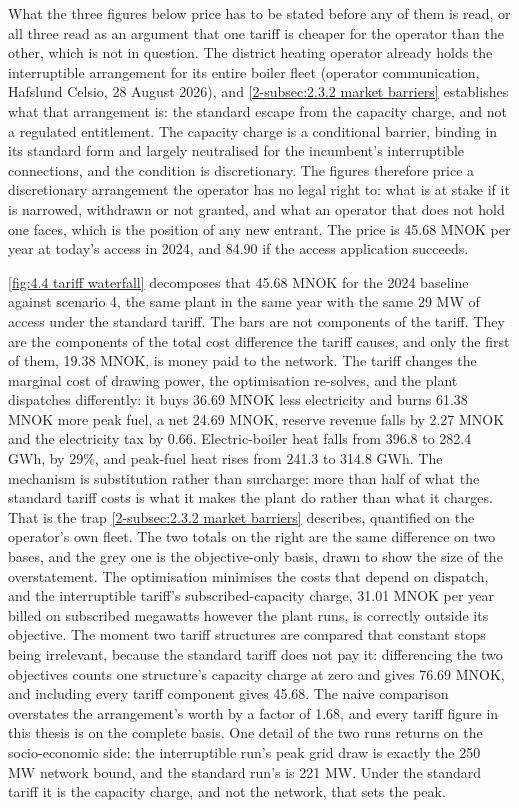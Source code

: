 What the three figures below price has to be stated before any of them is read, or all three read as an argument that one tariff is cheaper for the operator than the other, which is not in question. The district heating operator already holds the interruptible arrangement for its entire boiler fleet (operator communication, Hafslund Celsio, 28 August 2026), and \autoref{2-subsec:2.3.2 market barriers} establishes what that arrangement is: the standard escape from the capacity charge, and not a regulated entitlement. The capacity charge is a conditional barrier, binding in its standard form and largely neutralised for the incumbent's interruptible connections, and the condition is discretionary. The figures therefore price a discretionary arrangement the operator has no legal right to: what is at stake if it is narrowed, withdrawn or not granted, and what an operator that does not hold one faces, which is the position of any new entrant. The price is 45.68 MNOK per year at today's access in 2024, and 84.90 if the access application succeeds.

\autoref{fig:4.4 tariff waterfall} decomposes that 45.68 MNOK for the 2024 baseline against scenario 4, the same plant in the same year with the same 29 MW of access under the standard tariff. The bars are not components of the tariff. They are the components of the total cost difference the tariff causes, and only the first of them, 19.38 MNOK, is money paid to the network. The tariff changes the marginal cost of drawing power, the optimisation re-solves, and the plant dispatches differently: it buys 36.69 MNOK less electricity and burns 61.38 MNOK more peak fuel, a net 24.69 MNOK, reserve revenue falls by 2.27 MNOK and the electricity tax by 0.66. Electric-boiler heat falls from 396.8 to 282.4 GWh, by $29\%$, and peak-fuel heat rises from 241.3 to 314.8 GWh. The mechanism is substitution rather than surcharge: more than half of what the standard tariff costs is what it makes the plant do rather than what it charges. That is the trap \autoref{2-subsec:2.3.2 market barriers} describes, quantified on the operator's own fleet. The two totals on the right are the same difference on two bases, and the grey one is the objective-only basis, drawn to show the size of the overstatement. The optimisation minimises the costs that depend on dispatch, and the interruptible tariff's subscribed-capacity charge, 31.01 MNOK per year billed on subscribed megawatts however the plant runs, is correctly outside its objective. The moment two tariff structures are compared that constant stops being irrelevant, because the standard tariff does not pay it: differencing the two objectives counts one structure's capacity charge at zero and gives 76.69 MNOK, and including every tariff component gives 45.68. The naive comparison overstates the arrangement's worth by a factor of 1.68, and every tariff figure in this thesis is on the complete basis. One detail of the two runs returns on the socio-economic side: the interruptible run's peak grid draw is exactly the 250 MW network bound, and the standard run's is 221 MW. Under the standard tariff it is the capacity charge, and not the network, that sets the peak.


